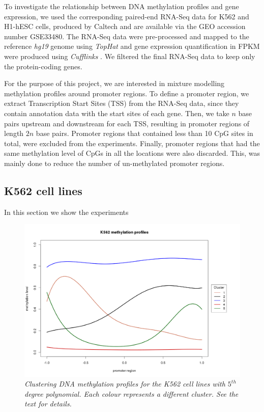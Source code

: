 To investigate the relationship between DNA methylation profiles and gene expression, we used the corresponding paired-end RNA-Seq data for K562 and H1-hESC cells, produced by Caltech and are available via the GEO accession number GSE33480. The RNA-Seq data were pre-processed and mapped to the reference \emph{hg19} genome using \emph{TopHat} \citep{Trapnell2009} and gene expression quantification in FPKM were produced using \emph{Cufflinks} \citep{Trapnell2010}. We filtered the final RNA-Seq data to keep only the protein-coding genes. 

For the purpose of this project, we are interested in mixture modelling methylation profiles around promoter regions. To define a promoter region, we extract Transcription Start Sites (TSS) from the RNA-Seq data, since they contain annotation data with the start sites of each gene. Then, we take $n$ base pairs upstream and downstream for each TSS, resulting in promoter regions of length $2n$ base pairs. Promoter regions that contained less than 10 CpG sites in total, were excluded from the experiments. Finally, promoter regions that had the same methylation level of CpGs in all the locations were also discarded. This, was mainly done to reduce the number of un-methylated promoter regions.


\subsection{K562 cell lines}
In this section we show the experiments 


\begin{figure}[!ht]
\begin{center}
 \includegraphics[scale = 0.39]{images/k562MethProfClusters}
\caption{\emph{Clustering DNA methylation profiles for the K562 cell lines with $5^{th}$ degree polynomial. Each colour represents a different cluster. See the text for details.}}
\label{k562MethProfClusters-pic}
\end{center}
\end{figure}

